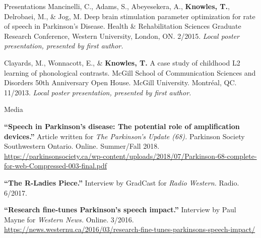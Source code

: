 \documentclass{resume} %
\begin{document}
\begin{rSection}{Presentations}
	Mancinelli, C., Adams, S., Abeyesekera, A., {\bf Knowles, T.}, Delrobaei, M., \& Jog, M. Deep brain stimulation parameter optimization for rate of speech in Parkinson's Disease. Health \& Rehabilitation Sciences Graduate Research Conference, Western University, London, ON. 2/2015. \emph{Local poster presentation, presented by first author.}

	Clayards, M., Wonnacott, E., \& {\bf Knowles, T.} A case study of childhood L2 learning of phonological contrasts. McGill School of Communication Sciences and Disorders 50th Anniversary Open House. McGill University. Montr\'eal, QC. 11/2013. \emph{Local poster presentation, presented by first author.}


\end{rSection}




\begin{rSection}{Media}

{\bf ``Speech in Parkinson's disease: The potential role of amplification devices.''} Article written for \textit{The Parkinson's Update (68).} Parkinson Society Southwestern Ontario. Online. Summer/Fall 2018. \url{https://parkinsonsociety.ca/wp-content/uploads/2018/07/Parkinson-68-complete-for-web-Compressed-003-final.pdf}

{\bf ``The R-Ladies Piece.''} Interview by GradCast for \textit{Radio Western.} Radio. 6/2017.

{\bf ``Research fine-tunes Parkinson's speech impact.''} Interview by Paul Mayne for \textit{Western News.} Online. 3/2016. \url{https://news.westernu.ca/2016/03/research-fine-tunes-parkinsons-speech-impact/}

\end{rSection}
\end{document}
